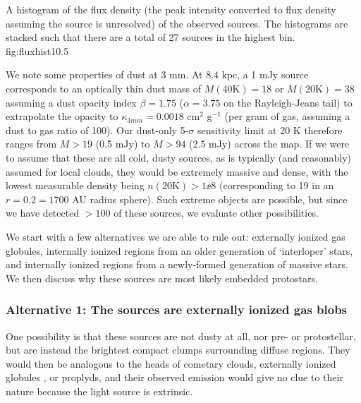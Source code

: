 \documentclass[twocolumn]{aastex61}
\newcommand{\dsgrb}{\ensuremath{8.4\textrm{~kpc}}\xspace}
\begin{document}
{A histogram of the flux density (the peak intensity converted to flux density
assuming the source is unresolved) of the observed sources. 
The histograms are stacked such that there are a total of 27 sources in the
highest bin.
}
{fig:fluxhist}{1}{0.5\textwidth}

We note some properties of dust at 3 mm.   At \dsgrb, a 1 mJy source
corresponds to an optically thin dust mass of $M(40\mathrm{K})=18$ \msun or
$M(20\mathrm{K})=38$ \msun assuming a dust opacity index $\beta=1.75$
($\alpha=3.75$ on the Rayleigh-Jeans tail) to extrapolate the
\citet{Ossenkopf1994a} opacity to $\kappa_{3mm}=0.0018$ cm$^2$ g$^{-1}$ (per
gram of gas, assuming a dust to gas ratio of 100).  Our dust-only 5-$\sigma$
sensitivity limit at 20 K therefore ranges from $M>19$ \msun (0.5 mJy) to $M>94$
\msun (2.5 mJy) across the map.  If we were to assume that these are all cold,
dusty sources, as is typically (and reasonably) assumed for local clouds, they
would be extremely massive and dense, with the lowest measurable density being
$n(20\mathrm{K}) > 1\ee{8}$ \percc (corresponding to 19 \msun in an
$r=0.2$\arcsec$=1700$ AU radius sphere).  Such extreme objects are possible,
but since we have detected $>100$ of these sources, we evaluate other
possibilities.

We start with a few alternatives we are able to rule out: externally
ionized gas globules, internally ionized \hii regions from an older
generation of `interloper' stars, and internally ionized \hii regions
from a newly-formed generation of massive stars.  We then discuss
why these sources are most likely embedded protostars.


\subsubsection{Alternative 1: The sources are externally ionized gas blobs}
One possibility is that these sources are not dusty at all, nor pre- or
protostellar, but are instead the brightest compact clumps surrounding diffuse
\hii regions.  They would then be analogous to the heads of cometary clouds,
externally ionized globules \citep[``EGGs"][]{Sahai2012a}, or proplyds, and
their observed emission would give no clue to their nature because the light
source is extrinsic.
\end{document}
